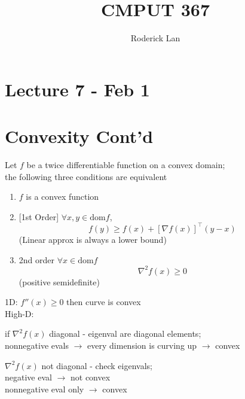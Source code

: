 \documentclass{article}
\title{CMPUT 367}
\author{Roderick Lan}
\date{}
\begin{document}
\maketitle

\tableofcontents
\break

\section*{Lecture 7 - Feb 1}
\section{Convexity Cont'd}
\begin{thm}
{}{}
Let $f$ be a twice differentiable function on a convex domain;
\\
the following three conditions are equivalent
\begin{enumerate}
    \item $f$ is a convex function
    \item {[1st Order]} $\forall x,y \in \mathrm{dom}f$, 
    \[
        f(y) \ge f(x) + [\nabla f(x)]^\top (y-x)
    \]
    (Linear approx is always a lower bound)
    \item {{2nd order}} $\forall x \in \mathrm{dom} f$ \[
        \nabla ^2 f(x) \ge 0
    \]
    (positive semidefinite)
\end{enumerate}
\end{thm}
\noindent
1D: $f''(x) \ge 0$ then curve is convex\\
High-D: 
\begin{list}{}{}
    \item if $\nabla^2 f(x)$ diagonal - eigenval are diagonal elements;\\
        nonnegative evals $\to$ every dimension is curving up $\to$ convex
    \item $\nabla^2 f(x)$ not diagonal - check eigenvals; \\negative eval $\to$ not convex 
    \\
    nonnegative eval only $\to$ convex
\end{list}
\pagebreak
\end{document}
